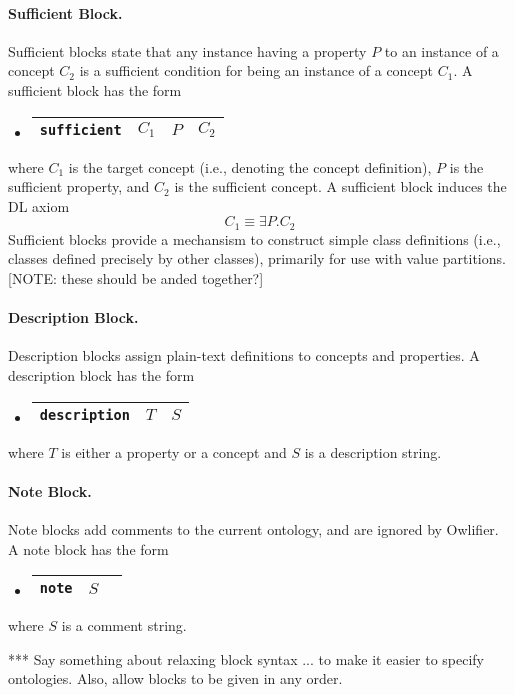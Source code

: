\documentclass[preprint,number]{elsarticle}
\newcommand{\owlifier}{Owlifier}
\begin{document}
\paragraph{Sufficient Block.} Sufficient blocks state that any
instance having a property $P$ to an instance of a concept $C_2$ is a
sufficient condition for being an instance of a concept $C_1$. A
sufficient block has the form
\begin{itemize}
\item[]
  \begin{tabular}{|l|l|l|l|}\hline \texttt{sufficient} & $C_1$ & $P$ & $C_2$
    \\ \hline
  \end{tabular}
\end{itemize}
where $C_1$ is the target concept (i.e., denoting the concept
definition), $P$ is the sufficient property, and $C_2$ is the
sufficient concept. A sufficient block induces the DL axiom \[C_1
\equiv \exists P.C_2\] Sufficient blocks provide a mechansism to
construct simple class definitions (i.e., classes defined precisely by
other classes), primarily for use with value partitions. [NOTE: these
should be anded together?]

\paragraph{Description Block.} Description blocks assign plain-text
definitions to concepts and properties. A description block has the
form
\begin{itemize}
\item[]
  \begin{tabular}{|l|l|l|}\hline \texttt{description} & $T$ & $S$
\\ \hline
  \end{tabular}
\end{itemize}
where $T$ is either a property or a concept and $S$ is a description
string.

\paragraph{Note Block.} Note blocks add comments to the current
ontology, and are ignored by \owlifier.  A note block has the form
\begin{itemize}
\item[]
  \begin{tabular}{|l|l|l|}\hline \texttt{note} & $S$
\\ \hline
  \end{tabular}
\end{itemize}
where $S$ is a comment string.

*** Say something about relaxing block syntax ... to make it easier to
specify ontologies. Also, allow blocks to be given in any order.



%


\end{document}
